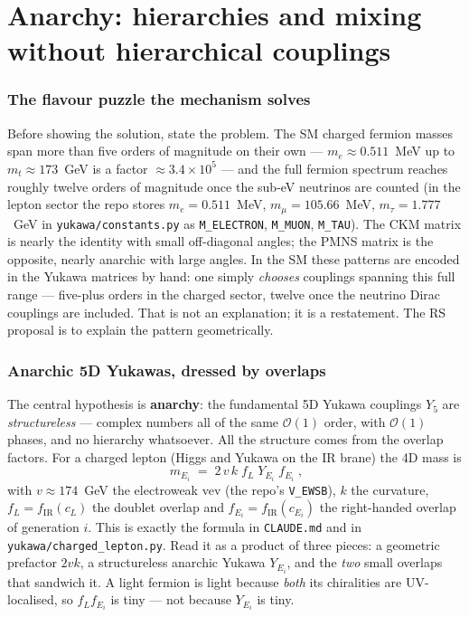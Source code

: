 \documentclass[11pt]{article}
\newcommand{\vev}{v}
\newcommand{\fIR}{f_{\mathrm{IR}}}
\newcommand{\code}[1]{\texttt{#1}}
\theoremstyle{definition}
\begin{document}
\part{Anarchy: hierarchies and mixing without hierarchical couplings}
\label{part:anarchy}

\section{The flavour puzzle the mechanism solves}
\label{sec:puzzle}

Before showing the solution, state the problem. The SM charged fermion masses span
more than five orders of magnitude on their own --- $m_e\approx0.511$~MeV up to
$m_t\approx173$~GeV is a factor $\approx3.4\times10^{5}$ --- and the full fermion
spectrum reaches roughly twelve orders of magnitude once the sub-eV neutrinos are
counted
(in the lepton sector the repo stores $m_e=0.511$~MeV, $m_\mu=105.66$~MeV,
$m_\tau=1.777$~GeV in \code{yukawa/constants.py} as \code{M\_ELECTRON},
\code{M\_MUON}, \code{M\_TAU}). The CKM matrix is nearly the identity with small
off-diagonal angles; the PMNS matrix is the opposite, nearly anarchic with large
angles. In the SM these patterns are encoded in the Yukawa matrices by hand: one
simply \emph{chooses} couplings spanning this full range --- five-plus orders in
the charged sector, twelve once the neutrino Dirac couplings are included. That is
not an explanation; it is a restatement. The RS proposal is to explain the pattern
geometrically.

\section{Anarchic 5D Yukawas, dressed by overlaps}
\label{sec:anarchicmass}

The central hypothesis is \textbf{anarchy}: the fundamental 5D Yukawa couplings
$Y_5$ are \emph{structureless} --- complex numbers all of the same
$\mathcal{O}(1)$ order, with $\mathcal{O}(1)$ phases, and no hierarchy whatsoever.
All the structure comes from the overlap factors. For a charged lepton (Higgs and
Yukawa on the IR brane) the 4D mass is
\begin{equation}
\boxed{\;m_{E_i} \;=\; 2\,\vev\,k\;f_{L}\;Y_{E_i}\;f_{E_i}\;,}
\label{eq:massform}
\end{equation}
with $\vev\approx174$~GeV the electroweak vev (the repo's \code{V\_EWSB}), $k$ the
curvature, $f_L=\fIR(c_L)$ the doublet overlap and $f_{E_i}=\fIR(c_{E_i})$ the
right-handed overlap of generation $i$. This is exactly the formula in
\code{CLAUDE.md} and in \code{yukawa/charged\_lepton.py}. Read it as a product of
three pieces: a geometric prefactor $2vk$, a structureless anarchic Yukawa
$Y_{E_i}$, and the \emph{two} small overlaps that sandwich it. A light fermion is
light because \emph{both} its chiralities are UV-localised, so $f_L f_{E_i}$ is
tiny --- not because $Y_{E_i}$ is tiny.
\end{document}
